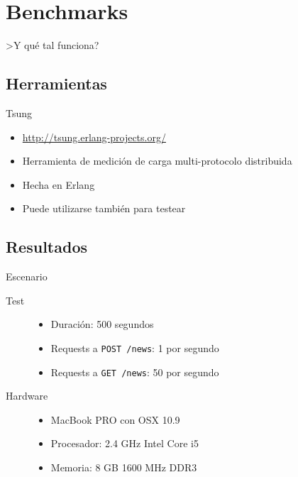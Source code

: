 \documentclass[utf8,hyperref={colorlinks=true}]{beamer}
\begin{document}
\section{Benchmarks}
\begin{frame}
\center\Huge >Y qu\'e tal funciona?
\end{frame}

\subsection{Herramientas}
\begin{frame}{Tsung}
	\begin{itemize}
		\item \href{http://tsung.erlang-projects.org/}{http://tsung.erlang-projects.org/}
		\item<+-> Herramienta de medici\'on de carga multi-protocolo distribuida
		\item<+-> Hecha en Erlang
		\item<+-> Puede utilizarse tambi\'en para testear
	\end{itemize}
\end{frame}

\subsection{Resultados}
\begin{frame}{Escenario}
	\begin{description}
		\item[Test]\begin{itemize}
			\item Duraci\'on: 500 segundos
			\item Requests a \texttt{POST /news}: 1 por segundo
			\item Requests a \texttt{GET /news}: 50 por segundo
		\end{itemize}
		\item[Hardware]\begin{itemize}
			\item MacBook PRO con OSX 10.9
			\item Procesador: 2.4 GHz Intel Core i5
			\item Memoria: 8 GB 1600 MHz DDR3
		\end{itemize}
	\end{description}

\end{frame}
\end{document}
